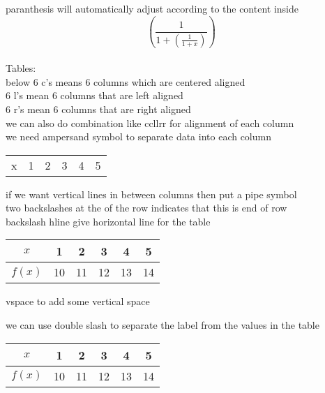 \documentclass[24pt]{article}
\begin{document}
paranthesis will automatically adjust according to the content inside\\
$$\left(  \frac{1}{1+ \left(  \frac{1}{1+x}  \right)}  \right)$$\\[20pt]




Tables:\\

below 6 c's means 6 columns which are centered aligned\\
6 l's mean 6 columns that are left aligned\\
6 r's mean 6 columns that are right aligned\\
we can also do combination like    ccllrr   for alignment of each column\\
we need ampersand symbol to separate data into each column\\[6pt]
\begin{tabular}{cccccc}
x & 1 & 2 & 3 & 4 & 5
\end{tabular}

\vspace{1cm}

if we want vertical lines in between columns then put a pipe symbol\\
two backslashes at the of the row indicates that this is end of row\\
backslash hline give horizontal line for the table\\[6pt]
\begin{tabular}{|c|c|c|c|c|c|}
\hline
$x$ & 1 & 2 & 3 & 4 & 5 \\ \hline
$f(x)$ & 10 & 11 & 12 & 13 & 14 \\ \hline
\end{tabular}

\vspace{1cm}
vspace to add some vertical space
\vspace{1cm}

we can use double slash to separate the label from the values in the table\\
\begin{tabular}{|c||c|c|c|c|c|}
\hline
$x$ & 1 & 2 & 3 & 4 & 5 \\ \hline
$f(x)$ & 10 & 11 & 12 & 13 & 14 \\ \hline
\end{tabular}

\vspace{1cm}
\end{document}
